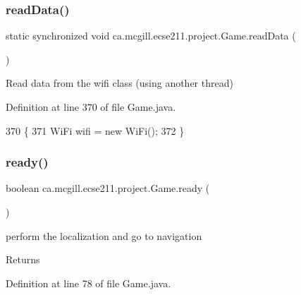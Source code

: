 \subsubsection{\texorpdfstring{read\+Data()}{readData()}}
{\footnotesize\ttfamily static synchronized void ca.\+mcgill.\+ecse211.\+project.\+Game.\+read\+Data (\begin{DoxyParamCaption}{ }\end{DoxyParamCaption})\hspace{0.3cm}{\ttfamily [static]}}

Read data from the wifi class (using another thread) 

Definition at line 370 of file Game.\+java.


\begin{DoxyCode}
370                                              \{
371     WiFi wifi = \textcolor{keyword}{new} WiFi();
372   \}
\end{DoxyCode}
\mbox{\label{enumca_1_1mcgill_1_1ecse211_1_1project_1_1_game_af0afcc3fad6172857252b89624f48e32}} 
\subsubsection{\texorpdfstring{ready()}{ready()}}
{\footnotesize\ttfamily boolean ca.\+mcgill.\+ecse211.\+project.\+Game.\+ready (\begin{DoxyParamCaption}{ }\end{DoxyParamCaption})}

perform the localization and go to navigation

\begin{DoxyReturn}{Returns}

\end{DoxyReturn}


Definition at line 78 of file Game.\+java.


